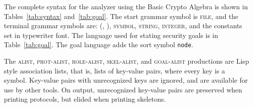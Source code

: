 The complete syntax for the analyzer using the Basic Crypto Algebra is
shown in Tables~\ref{tab:syntax} and~\ref{tab:goal}.  The start
grammar symbol is \textsc{file}, and the terminal grammar symbols
are: \textsc{(, ), symbol, string, integer,} and the constants set in
typewriter font.  The language used for stating security goals is in
Table~\ref{tab:goal}.  The goal language adds the sort
symbol \texttt{node}.

The \textsc{alist}, \textsc{prot-alist}, \textsc{role-alist},
\textsc{skel-alist}, and \textsc{goal-alist} productions are
Lisp style association lists, that is, lists of key-value pairs, where
every key is a symbol.  Key-value pairs with unrecognized keys are
ignored, and are available for use by other tools.  On output,
unrecognized key-value pairs are preserved when printing protocols,
but elided when printing skeletons.


